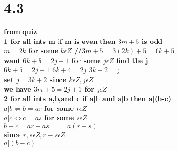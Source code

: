 \documentclass[10pt,letterpaper]{report}
\begin{document}
\section{4.3}

\paragraph{from quiz \\ 1 for all ints m if m is even then $3m + 5 $ is odd \\ $m = 2k $ for some $ k \epsilon Z$ //$3m + 5 = 3(2k) + 5 = 6k + 5$ \\want $ 6k + 5 = 2 j + 1 $ for some $j \epsilon Z$ find the j \\ $6k + 5 = 2 j + 1 $  $ 6k + 4 = 2j $  $ 3k + 2 = j$ \\set $j = 3k + 2$ since $ k \epsilon Z , j \epsilon Z$ \\ we have $ 3m + 5 = 2 j + 1 $ for $ j \epsilon Z$  \\ 2 for all ints a,b,and c if a|b and  a|b then a|(b-c)\\ $a|b \Leftrightarrow b = ar$ for some $ r \epsilon Z$ \\ $a|c \Leftrightarrow c = as $ for some $ s \epsilon Z $ \\ $ b-c = ar- as ==a(r-s) $\\ since $ r, s \epsilon Z, r-s \epsilon Z $\\ $ a|(b-c)$}
\end{document}
